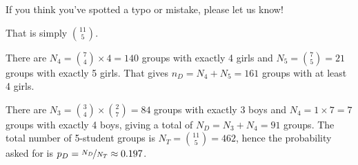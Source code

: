 \documentclass[a4paper,10pt,landscape,twocolumn]{scrartcl}
\begin{document}
\solutions


\noindent
If you think you've spotted a typo or mistake, please let us know!

\begin{exercise}[]
	
	\begin{subex}
		That is simply $ 11 \choose 5$.
	\end{subex}

	 \begin{subex}
	 	There are $N_4 = {7 \choose 4} \times 4 = 140$ groups with exactly 4 girls and $N_5 = {7 \choose 5} = 21$ groups with exactly 5 girls. That gives $n_D = N_4 + N_5 = 161$ groups with at least 4 girls.
	 \end{subex}
	 
	 \begin{subex}
		There are $N_3 = {3 \choose 4} \times {2 \choose 7} = 84$ groups with exactly 3 boys and $N_4 = 1 \times 7 = 7$ groups with exactly 4 boys, giving a total of $N_D = N_3 + N_4 = 91$ groups.
		The total number of 5-student groups is $N_T = {11 \choose 5} = 462$, hence the probability asked for is $p_D = \nicefrac{N_D}{N_T} \approx 0.197$.
	 \end{subex}
\end{exercise}
\end{document}
